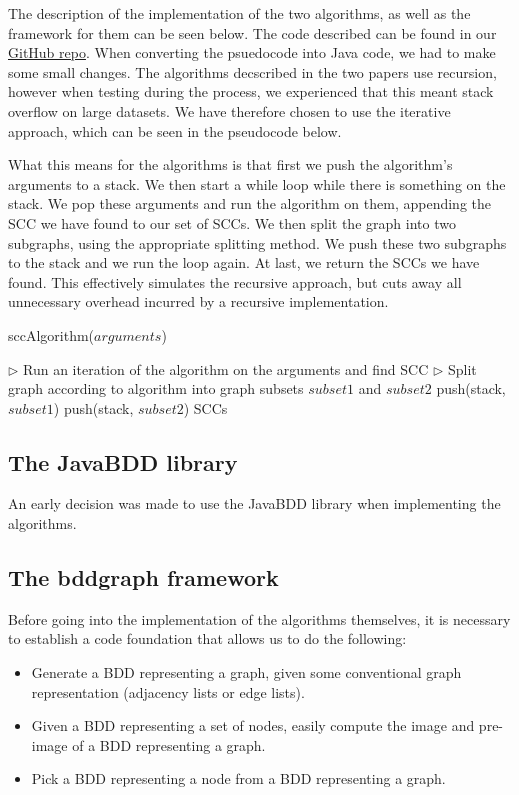 \documentclass[../master/master.tex]{subfiles}
\begin{document}
The description of the implementation of the two algorithms, as well as the framework for them can be seen below. The code described can be found in our \href{https://github.com/mikaelbdj/bachelor-thesis}{GitHub repo}. When converting the psuedocode into Java code, we had to make some small changes. The algorithms decscribed in the two papers \cite{lockstep}\cite{linear} use recursion, however when testing during the process, we experienced that this meant stack overflow on large datasets. We have therefore chosen to use the iterative approach, which can be seen in the pseudocode below.

What this means for the algorithms is that first we push the algorithm's arguments to a stack. We then start a while loop while there is something on the stack. We pop these arguments and run the algorithm on them, appending the SCC we have found to our set of SCCs. We then split the graph into two subgraphs, using the appropriate splitting method. We push these two subgraphs to the stack and we run the loop again. At last, we return the SCCs we have found. This effectively simulates the recursive approach, but cuts away all unnecessary overhead incurred by a recursive implementation.

\begin{algorithm}[H]
  \caption{sccAlgorithm($arguments$)}
  \begin{algorithmic}[1]
    \Statex
    \State \(\triangleright\) Run an iteration of the algorithm on the arguments and find SCC
    \State \(\triangleright\) Split graph according to algorithm into graph subsets $subset1$ and $subset2$
    \State push(stack, $subset1$)
    \State push(stack, $subset2$)
    \EndWhile
    \Statex
    \State \Return SCCs
  \end{algorithmic}
\end{algorithm}

\subsection{The JavaBDD library}
An early decision was made to use the JavaBDD library when implementing the algorithms. \cite{whaley}

\subsection{The bddgraph framework}
Before going into the implementation of the algorithms themselves, it is necessary to establish a code foundation that allows us to do the following:
\begin{itemize}
\item Generate a BDD representing a graph, given some conventional graph representation (adjacency lists or edge lists).
\item Given a BDD representing a set of nodes, easily compute the image and pre-image of a BDD representing a graph.
\item Pick a BDD representing a node from a BDD representing a graph.
\end{itemize}
\end{document}
